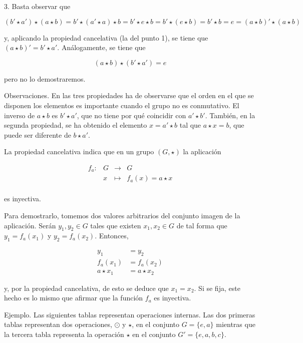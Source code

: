 3. Basta observar que

$$ (b' \star a') \star (a \star b) = b' \star (a' \star a) \star b = b'
\star e \star b = b' \star (e \star b) = b' \star b = e = (a \star b)' \star
(a \star b) $$

\noindent y, aplicando la propiedad cancelativa (la del punto 1), se tiene
que $(a \star b)' = b' \star a'$. Análogamente, se tiene que

$$ (a \star b) \star (b' \star a') = e $$

\noindent pero no lo demostraremos.

Observaciones. En las tres propiedades ha de observarse que el orden en el
que se disponen los elementos es importante cuando el grupo no es
conmutativo. El inverso de $a \star b$ es $b' \star a'$, que no tiene por
qué coincidir con $a' \star b'$. También, en la segunda propiedad, se ha
obtenido el elemento $x = a' \star b$ tal que $a \star x = b$, que puede ser
diferente de $b \star a'$.

La propiedad cancelativa indica que en un grupo $(G, \star)$ la aplicación

$$
\begin{array}{llll}
  f_a:  & G & \longrightarrow & G \\
        & x & \longmapsto     & f_a(x) = a \star x \\
\end{array}
$$

\noindent es inyectiva.

Para demostrarlo, tomemos dos valores arbitrarios del conjunto imagen de la
aplicación. Serán $y_1, y_2 \in G$ tales que existen $x_1, x_2 \in G$ de tal
forma que $y_1 = f_a(x_1)$ y $y_2 = f_a(x_2)$. Entonces,

\begin{align*}
  y_1 &= y_2 \\
  f_a(x_1) &= f_a(x_2) \\
  a \star x_1 &= a \star x_2
\end{align*}

\noindent y, por la propiedad cancelativa, de esto se deduce que $x_1 =
x_2$. Si se fija, este hecho es lo mismo que afirmar que la función $f_a$ es
inyectiva.

Ejemplo. Las siguientes tablas representan operaciones internas. Las dos
primeras tablas representan dos operaciones, $\odot$ y $\star$, en el
conjunto $G = \{e, a\}$ mientras que la tercera tabla representa la
operación $\star$ en el conjunto $G' = \{e, a, b, c\}$.

